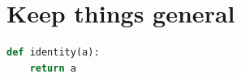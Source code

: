 \documentclass[ignorenonframetext,aspectratio=169]{beamer}
\begin{document}
\begin{frame}[plain]
\centering
{}
\end{frame}

\begin{frame}[plain]
\centering
{}
\end{frame}

\part{Keep things general}

\begin{frame}[fragile]
\begin{lstlisting}[language=Python]
def identity(a):
    return a
\end{lstlisting}
\end{frame}
\end{document}
